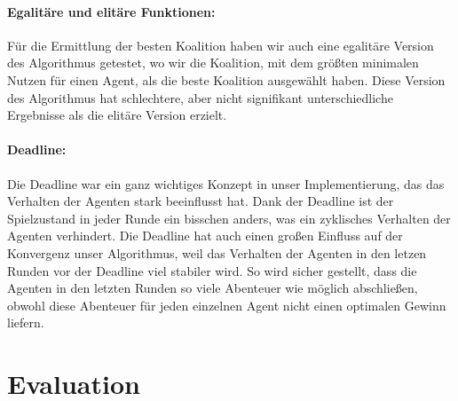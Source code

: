 \documentclass[fleqn,10pt]{SelfArx} %
\begin{document}
\paragraph{Egalitäre und elitäre Funktionen:} Für die Ermittlung der besten Koalition haben wir auch eine egalitäre Version des Algorithmus getestet, wo wir die Koalition, mit dem größten minimalen Nutzen für einen Agent, als die beste Koalition ausgewählt haben. Diese Version des Algorithmus hat schlechtere, aber nicht signifikant unterschiedliche Ergebnisse als die elitäre Version erzielt.


\paragraph{Deadline:}
Die Deadline war ein ganz wichtiges Konzept in unser Implementierung, das das Verhalten der Agenten stark beeinflusst hat. Dank der Deadline ist der Spielzustand in jeder Runde ein bisschen anders, was ein zyklisches Verhalten der Agenten verhindert. Die Deadline hat auch einen großen Einfluss auf der Konvergenz unser Algorithmus, weil das Verhalten der Agenten in den letzen Runden vor der Deadline viel stabiler wird. So wird sicher gestellt, dass die Agenten in den letzten Runden so viele Abenteuer wie möglich abschließen, obwohl diese Abenteuer für jeden einzelnen Agent nicht einen optimalen Gewinn liefern.

\section{Evaluation}
\label{sec:Evaluation}
\end{document}
